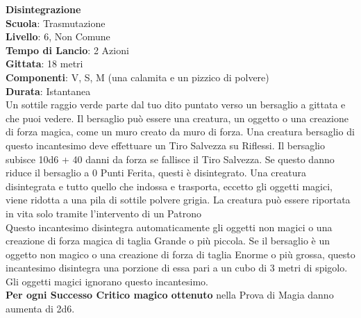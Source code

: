 \begin{multicols}{2}
\medskip\textbf{Disintegrazione}\\
\textbf{Scuola}: Trasmutazione\\
\textbf{Livello}: 6, Non Comune\\
\textbf{Tempo di Lancio}: 2 Azioni\\
\textbf{Gittata}: 18 metri\\
\textbf{Componenti}: V, S, M (una calamita e un pizzico di polvere)\\
\textbf{Durata}: Istantanea\\
Un sottile raggio verde parte dal tuo dito puntato verso un bersaglio a gittata e che puoi vedere. Il bersaglio può essere una creatura, un oggetto o una creazione di forza magica, come un muro creato da muro di forza. Una creatura bersaglio di questo incantesimo deve effettuare un Tiro Salvezza su Riflessi. Il bersaglio subisce 10d6 + 40 danni da forza se fallisce il Tiro Salvezza. Se questo danno riduce il bersaglio a 0 Punti Ferita, questi è disintegrato. Una creatura disintegrata e tutto quello che indossa e trasporta, eccetto gli oggetti magici, viene ridotta a una pila di sottile polvere grigia. La creatura può essere riportata in vita solo tramite l'intervento di un Patrono\\
Questo incantesimo disintegra automaticamente gli oggetti non magici o una creazione di forza magica di taglia Grande o più piccola. Se il bersaglio è un oggetto non magico o una creazione di forza di taglia Enorme o più grossa, questo incantesimo disintegra una porzione di essa pari a un cubo di 3 metri di spigolo. Gli oggetti magici ignorano questo incantesimo.\\
\textbf{Per ogni Successo Critico magico ottenuto} nella Prova di Magia danno aumenta di 2d6.


\end{multicols}
